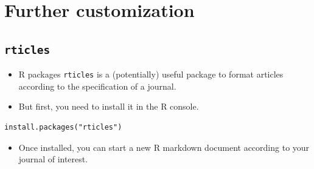 \documentclass[]{article}
\providecommand{\tightlist}{%
  \setlength{\itemsep}{0pt}\setlength{\parskip}{0pt}}
\begin{document}
\hypertarget{further-customization}{%
\section{Further customization}\label{further-customization}}

\hypertarget{rticles}{%
\subsection{\texorpdfstring{\texttt{rticles}}{rticles}}\label{rticles}}

\begin{itemize}
\item
  R packages \texttt{rticles} is a (potentially) useful package to
  format articles according to the specification of a journal.
\item
  But first, you need to install it in the R console.
\end{itemize}

\begin{verbatim}
install.packages("rticles")
\end{verbatim}

\begin{itemize}
\tightlist
\item
  Once installed, you can start a new R markdown document according to
  your journal of interest.
\end{itemize}
\end{document}
